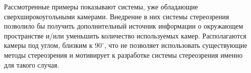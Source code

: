 
Рассмотренные примеры показывают системы, уже обладающие сверхширокоугольными камерами. Внедрение в них системы стереозрения 
позволило бы получить дополнительный источник информации о окружающем пространстве и/или уменьшить количество используемых камер. 
Располагаются камеры под углом, близким к $90^\circ$, что не позволяет использовать существующие методы стереозрения и 
мотивирует к разработке системы стереозрения именно для такого случая. 

\vspace{\baselineskip}